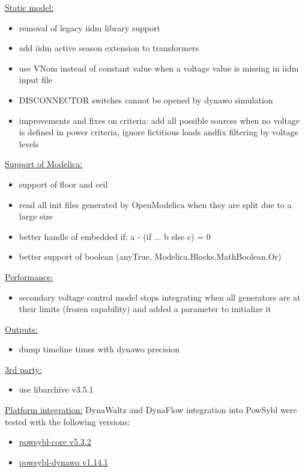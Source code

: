 \documentclass[a4paper, 12pt]{report}
\begin{document}
\underline{Static model:}

\begin{itemize}
\item removal of legacy iidm library support
\item add iidm active season extension to transformers
\item use VNom instead of constant value when a voltage value is missing in iidm input file
\item DISCONNECTOR switches cannot be opened by dynawo simulation
\item improvements and fixes on criteria: add all possible sources when no voltage is defined in power criteria, ignore fictitious loads andfix filtering by voltage levels
\end{itemize}

\underline{Support of Modelica:}

\begin{itemize}
\item support of floor and ceil
\item read all init files generated by OpenModelica when they are split due to a large size
\item better handle of embedded if: a - (if ... b else c) = 0
\item better support of boolean (anyTrue, Modelica.Blocks.MathBoolean.Or)
\end{itemize}

\underline{Performance:}

\begin{itemize}
\item secondary voltage control model stops integrating when all generators are at their limits (frozen capability) and added a parameter to initialize it
\end{itemize}

\underline{Outputs:}

\begin{itemize}
\item dump timeline times with dynawo precision
\end{itemize}

\underline{3rd party:}

\begin{itemize}
\item use libarchive v3.5.1
\end{itemize}

\underline{Platform integration:}
DynaWaltz and DynaFlow integration into PowSybl were tested with the following versions:
\begin{itemize}
\item \href{https://github.com/powsybl/powsybl-core/releases/tag/v5.3.2}{powsybl-core v5.3.2}
\item \href{https://github.com/powsybl/powsybl-dynawo/releases/tag/v1.14.1}{powsybl-dynawo v1.14.1}
\end{itemize}
\end{document}

